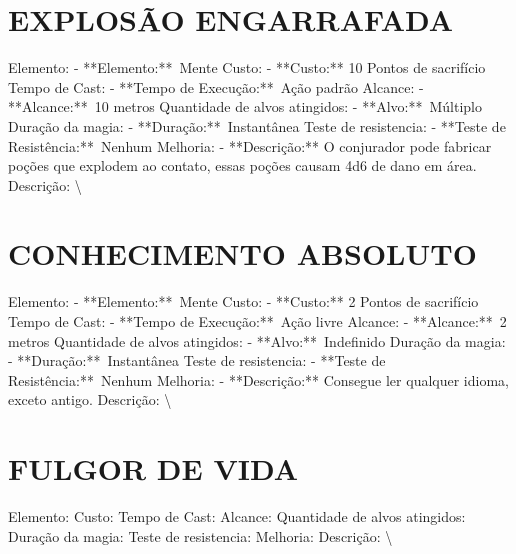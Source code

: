 \documentclass{article}%
\begin{document}
\section{EXPLOSÃO ENGARRAFADA}%
\label{sec:EXPLOSOENGARRAFADA}%
Elemento: {-} **Elemento:**~Mente\newline%
Custo: {-} **Custo:** 10 Pontos de sacrifício\newline%
Tempo de Cast: {-} **Tempo de Execução:**~Ação padrão\newline%
Alcance: {-} **Alcance:**~10 metros\newline%
Quantidade de alvos atingidos: {-} **Alvo:**~Múltiplo\newline%
Duração da magia: {-} **Duração:**~Instantânea\newline%
Teste de resistencia: {-} **Teste de Resistência:**~Nenhum\newline%
Melhoria: {-} **Descrição:** O conjurador pode fabricar poções que explodem ao contato, essas poções causam 4d6 de dano em área.\newline%
Descrição: \textbackslash{}

%
\section{CONHECIMENTO ABSOLUTO}%
\label{sec:CONHECIMENTOABSOLUTO}%
Elemento: {-} **Elemento:**~Mente\newline%
Custo: {-} **Custo:** 2 Pontos de sacrifício\newline%
Tempo de Cast: {-} **Tempo de Execução:**~Ação livre\newline%
Alcance: {-} **Alcance:**~2 metros\newline%
Quantidade de alvos atingidos: {-} **Alvo:**~Indefinido\newline%
Duração da magia: {-} **Duração:**~Instantânea\newline%
Teste de resistencia: {-} **Teste de Resistência:**~Nenhum\newline%
Melhoria: {-} **Descrição:** Consegue ler qualquer idioma, exceto antigo.\newline%
Descrição: \textbackslash{}

%
\section{FULGOR DE VIDA}%
\label{sec:FULGORDEVIDA}%
Elemento: \newline%
Custo: \newline%
Tempo de Cast: \newline%
Alcance: \newline%
Quantidade de alvos atingidos: \newline%
Duração da magia: \newline%
Teste de resistencia: \newline%
Melhoria: \newline%
Descrição: \textbackslash{}
\end{document}

